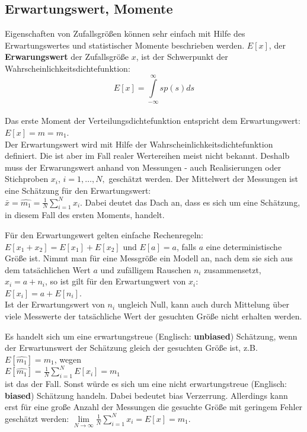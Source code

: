 \subsection{Erwartungswert, Momente}
Eigenschaften von Zufallsgrößen können sehr einfach mit Hilfe des Erwartungswertes und statistischer Momente beschrieben werden.  $E[x]$, der {\bf Erwarungswert} der Zufallsgröße $x$, ist der Schwerpunkt der Wahrscheinlichkeitsdichtefunktion:\\
 \begin{equation} E[x] = \int\limits_{-\infty}^{\infty}sp(s)ds\end{equation}\\
Das erste Moment der Verteilungsdichtefunktion entspricht dem Erwartungswert: \\
$E[x]=m=m_1$.\\
Der Erwartungswert wird mit Hilfe der Wahrscheinlichkeitsdichtefunktion definiert. Die ist aber im Fall realer Wertereihen meist nicht bekannt. Deshalb muss der Erwarungswert anhand von Messungen - auch Realisierungen oder Stichproben $x_i$,   $i=1,\dots, N,$  geschätzt werden. Der Mittelwert der Messungen ist eine Schätzung für den Erwartungswert:\\
$\bar{x}=\hat{m_1}=\frac{1}{N}\sum \limits_{i=1}^N x_i$.
Dabei deutet das Dach an, dass es sich um eine Schätzung, in diesem Fall des ersten Moments, handelt. 

Für den Erwartungswert gelten einfache Rechenregeln:\\ 
 $E[x_1+x_2]=E[x_1]+E[x_2]$ und $E[a]=a$, falls $a$ eine deterministische Größe ist. Nimmt man für eine Messgröße ein Modell an, nach dem sie sich aus dem tatsächlichen Wert $a$ und zufälligem Rauschen $n_i$  zusammensetzt, $x_i = a + n_i$, so ist gilt für den Erwartungwert von $x_i$:\\
$E[x_i] = a + E[n_i]$.\\
 Ist der Erwartungswert von $n_i$ ungleich Null, kann auch durch Mittelung über viele Messwerte der tatsächliche Wert der gesuchten Größe nicht erhalten werden.

Es handelt sich um eine erwartungstreue (Englisch: {\bf unbiased}) Schätzung, wenn der Erwartunswert der Schätzung gleich der gesuchten Größe ist, z.B. $E[ \hat{m_1} ]= m_1$, wegen\\
$ E[\hat{m_1}] =\frac{1}{N}\sum \limits_{i=1}^N E[x_i] = m_1 $\\
ist das der Fall. Sonst würde es sich um eine nicht erwartungstreue (Englisch: {\bf biased}) Schätzung handeln. Dabei bedeutet bias Verzerrung. Allerdings kann erst für eine große Anzahl der Messungen die gesuchte Größe mit geringem Fehler geschätzt werden: 
 $\lim\limits_{N \to \infty}\frac{1}{N}\sum \limits_{i=1}^N x_i=E[x]=m_1$. 

